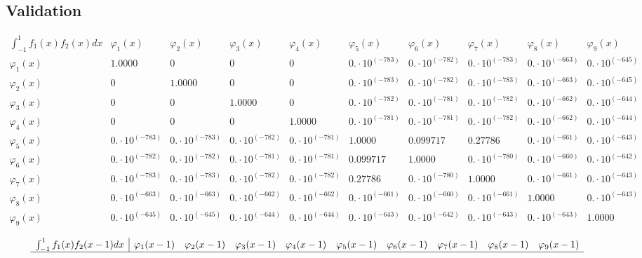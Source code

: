\documentclass{article}
\begin{document}
 \begin{landscape}
 \subsection{Validation}$$ \begin{array}{l|lllllllll}
\int_{-1}^1 f_1(x)f_2(x) dx& \varphi_1(x)& \varphi_2(x)& \varphi_3(x)& \varphi_4(x)& \varphi_5(x)& \varphi_6(x)& \varphi_7(x)& \varphi_8(x)& \varphi_9(x) \\ \hline 
 \varphi_1(x) & 1.0000 & 0 & 0 & 0 & 0.\cdot 10^{(-783)} & 0.\cdot 10^{(-782)} & 0.\cdot 10^{(-783)} & 0.\cdot 10^{(-663)} & 0.\cdot 10^{(-645)} \\ 
\varphi_2(x) & 0 & 1.0000 & 0 & 0 & 0.\cdot 10^{(-783)} & 0.\cdot 10^{(-782)} & 0.\cdot 10^{(-783)} & 0.\cdot 10^{(-663)} & 0.\cdot 10^{(-645)} \\ 
\varphi_3(x) & 0 & 0 & 1.0000 & 0 & 0.\cdot 10^{(-782)} & 0.\cdot 10^{(-781)} & 0.\cdot 10^{(-782)} & 0.\cdot 10^{(-662)} & 0.\cdot 10^{(-644)} \\ 
\varphi_4(x) & 0 & 0 & 0 & 1.0000 & 0.\cdot 10^{(-781)} & 0.\cdot 10^{(-781)} & 0.\cdot 10^{(-782)} & 0.\cdot 10^{(-662)} & 0.\cdot 10^{(-644)} \\ 
\varphi_5(x) & 0.\cdot 10^{(-783)} & 0.\cdot 10^{(-783)} & 0.\cdot 10^{(-782)} & 0.\cdot 10^{(-781)} & 1.0000 & 0.099717 & 0.27786 & 0.\cdot 10^{(-661)} & 0.\cdot 10^{(-643)} \\ 
\varphi_6(x) & 0.\cdot 10^{(-782)} & 0.\cdot 10^{(-782)} & 0.\cdot 10^{(-781)} & 0.\cdot 10^{(-781)} & 0.099717 & 1.0000 & 0.\cdot 10^{(-780)} & 0.\cdot 10^{(-660)} & 0.\cdot 10^{(-642)} \\ 
\varphi_7(x) & 0.\cdot 10^{(-783)} & 0.\cdot 10^{(-783)} & 0.\cdot 10^{(-782)} & 0.\cdot 10^{(-782)} & 0.27786 & 0.\cdot 10^{(-780)} & 1.0000 & 0.\cdot 10^{(-661)} & 0.\cdot 10^{(-643)} \\ 
\varphi_8(x) & 0.\cdot 10^{(-663)} & 0.\cdot 10^{(-663)} & 0.\cdot 10^{(-662)} & 0.\cdot 10^{(-662)} & 0.\cdot 10^{(-661)} & 0.\cdot 10^{(-660)} & 0.\cdot 10^{(-661)} & 1.0000 & 0.\cdot 10^{(-643)} \\ 
\varphi_9(x) & 0.\cdot 10^{(-645)} & 0.\cdot 10^{(-645)} & 0.\cdot 10^{(-644)} & 0.\cdot 10^{(-644)} & 0.\cdot 10^{(-643)} & 0.\cdot 10^{(-642)} & 0.\cdot 10^{(-643)} & 0.\cdot 10^{(-643)} & 1.0000 \\ 
\end{array} $$
$$ \begin{array}{l|lllllllll}
\int_{-1}^1 f_1(x)f_2(x-1) dx& \varphi_1(x-1)& \varphi_2(x-1)& \varphi_3(x-1)& \varphi_4(x-1)& \varphi_5(x-1)& \varphi_6(x-1)& \varphi_7(x-1)& \varphi_8(x-1)& \varphi_9(x-1) \\ \hline 

\end{array}$$
\end{landscape}
\end{document}
